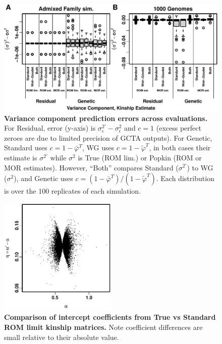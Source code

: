 \documentclass[11pt]{article}
\begin{document}
\begin{figure}[bp!]
  \centering
  \includegraphics[width=\textwidth]{preds-reml-errors.pdf}
  \caption{
    {\bf Variance component prediction errors across evaluations.}
    For Residual, error (y-axis) is $\sigma^{2\prime}_\epsilon - \sigma^2_\epsilon$ and $c = 1$ (excess perfect zeroes are due to limited precision of GCTA outputs).
    For Genetic, Standard uses $c = 1 - \bar{\varphi}^T$, WG uses $c = 1 - \tilde{\varphi}^T$, in both cases their estimate is $\sigma^{2\prime}$ while $\sigma^2$ is True (ROM lim.) or Popkin (ROM or MOR estimates).
    However, ``Both'' compares Standard ($\sigma^{2\prime}$) to WG ($\sigma^2$), and Genetic uses $c = \left( 1 - \bar{\varphi}^T \right) / \left( 1 - \tilde{\varphi}^T \right)$.
    Each distribution is over the 100 replicates of each simulation.
  }
  \label{fig:preds-reml-errors}
\end{figure}

\begin{figure}[bp!]
  \centering
  \includegraphics[width=0.5\textwidth]{sim-admix-n1000-m100000-k3-f0.3-s0.5-mc100-h0.8-g20-fes/lmm-intercept-test.pdf}
  \caption{
    {\bf Comparison of intercept coefficients from True vs Standard ROM limit kinship matrices.}
    Note coefficient differences are small relative to their absolute value.
  }
  \label{fig:lmm-intercept-test}
\end{figure}
\end{document}

